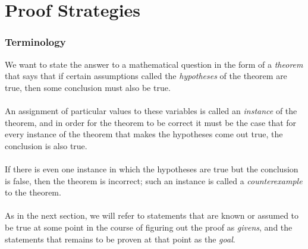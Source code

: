 \documentclass{report}
\begin{document}
\chapter{Proof Strategies}
\subsection{Terminology}
We want to state the answer to a mathematical question in the form of a \textit{theorem} that says that if certain assumptions called the \textit{hypotheses} of the theorem are true, then
some conclusion must also be true.\\
\vspace{1mm}\\
An assignment of particular values to these variables is called an \textit{instance} of the theorem, and in order for the theorem to be correct it must be the case
that for every instance of the theorem that makes the hypotheses come out true, the conclusion is also true.\\
\vspace{1mm}\\
If there is even one instance
in which the hypotheses are true but the conclusion is false, then the theorem is incorrect; such an instance is called a \textit{counterexample} to the theorem.\\
\vspace{1mm}\\
As in the next section, we will refer to statements that are known or assumed to be true at some point in the course of figuring out the proof as \textit{givens}, and the statements that remains
to be proven at that point as the \textit{goal}.
\newpage
\end{document}
